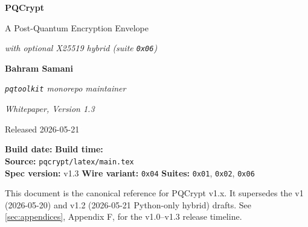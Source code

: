 \documentclass[11pt,letterpaper]{article}
\begin{document}

\begin{titlepage}
  \centering
  \vspace*{2.0cm}
  {\Huge\bfseries PQCrypt\par}
  \vspace{0.6cm}
  {\Large A Post-Quantum Encryption Envelope\par}
  \vspace{0.3cm}
  {\large\itshape with optional X25519 hybrid (suite \texttt{0x06})\par}
  \vspace{1.6cm}
  {\large\bfseries Bahram Samani\par}
  \vspace{0.4em}
  {\small\itshape \texttt{pqtoolkit} monorepo maintainer\par}
  \vspace{1.6cm}
  {\large\itshape Whitepaper, Version 1.3\par}
  \vspace{0.3em}
  {\small Released 2026-05-21\par}
  \vspace{1.6cm}
  \begin{tcolorbox}[colback=gray!5,colframe=black!30,width=0.78\textwidth]
    \centering\small
    \textbf{Build date:} \buildDate \quad\textbf{Build time:} \buildTime\\[0.4em]
    \textbf{Source:} \texttt{pqcrypt/latex/main.tex}\\[0.4em]
    \textbf{Spec version:} v1.3 \quad\textbf{Wire variant:} \texttt{0x04} \quad\textbf{Suites:} \texttt{0x01}, \texttt{0x02}, \texttt{0x06}
  \end{tcolorbox}
  \vfill
  {\small This document is the canonical reference for PQCrypt v1.x. It supersedes the v1 (2026-05-20) and v1.2 (2026-05-21 Python-only hybrid) drafts. See \cref{sec:appendices}, Appendix F, for the v1.0--v1.3 release timeline.\par}
  \vspace{0.5cm}
\end{titlepage}

\setcounter{tocdepth}{2}
\tableofcontents
\newpage


















\end{document}
